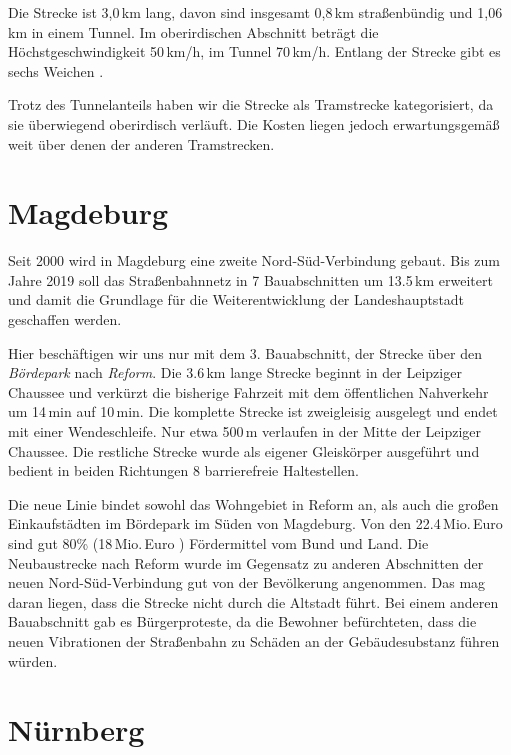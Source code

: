 Die Strecke ist 3,0\,km lang, davon sind insgesamt 0,8\,km straßenbündig und 1,06\,km in einem Tunnel.
Im oberirdischen Abschnitt beträgt die Höchst\-gesch\-windig\-keit 50\,km/h, im Tunnel 70\,km/h.
Entlang der Strecke gibt es sechs Weichen \cite{u15mail}.

Trotz des Tunnelanteils haben wir die Strecke als Tramstrecke kategorisiert, da sie überwiegend oberirdisch verläuft. Die Kosten liegen jedoch erwartungsgemäß weit über denen der anderen Tramstrecken.

\section{Magdeburg}

Seit 2000 wird in Magdeburg eine zweite Nord-Süd-Verbindung
gebaut. Bis zum Jahre 2019 soll das Straßenbahnnetz in 7
Bauabschnitten um 13.5\,km erweitert und damit die Grundlage
für die Weiterentwicklung der Landeshauptstadt geschaffen
werden. \cite{mvbNordSued}

Hier beschäftigen wir uns nur mit dem 3. Bauabschnitt, der Strecke
über den \textit{Bördepark} nach \textit{Reform}. Die 3.6\,km lange
Strecke beginnt in der Leipziger Chaussee und verkürzt die bisherige
Fahrzeit mit dem öffentlichen Nahverkehr um 14\,min auf 10\,min. Die
komplette Strecke ist zweigleisig ausgelegt und endet mit einer
Wendeschleife. Nur etwa 500\,m verlaufen in der Mitte der Leipziger
Chaussee. Die restliche Strecke wurde als eigener Gleiskörper
ausgeführt und bedient in beiden Richtungen 8 barrierefreie
Haltestellen. \cite{ba3reform}

Die neue Linie bindet sowohl das Wohngebiet in Reform an, als auch die
großen Einkaufstädten im Bördepark im Süden von Magdeburg. Von den
22.4\,Mio.\,Euro \cite{volksstimme2009} sind gut 80\% (18\,Mio.\,Euro
\cite{ba3reform}) Fördermittel vom Bund und Land. Die Neubaustrecke
nach Reform wurde im Gegensatz zu anderen Abschnitten der neuen
Nord-Süd-Verbindung gut von der Bevölkerung angenommen. Das mag
daran liegen, dass die Strecke nicht durch die Altstadt führt. Bei
einem anderen Bauabschnitt gab es Bürgerproteste, da die Bewohner
befürchteten, dass die neuen Vibrationen der Straßenbahn zu Schäden an
der Gebäudesubstanz führen würden. \cite{volksstimme2008}

\section{Nürnberg}

